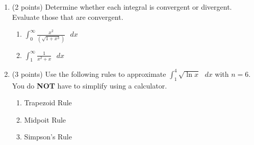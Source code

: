 \documentclass[paper=a4, fontsize=11pt]{scrartcl} %
\numberwithin{equation}{section} %
\numberwithin{figure}{section} %
\numberwithin{table}{section} %
\begin{document}
\begin{enumerate}
\vspace{1.5in}

\item (2 points) Determine whether each integral is convergent or divergent.  Evaluate those that are convergent.
\begin{enumerate}
\item \begin{large}$\int_0^\infty \frac{x^2}{(\sqrt{1+x^3})} \text { } dx$\end{large}
\vspace{1.5in}
\item \begin{large}$\int_1^\infty \frac{1}{x^2+x}\text { } dx$\end{large}
\end{enumerate}

\newpage

\item (3 points) Use the following rules to approximate $\int_1^4 \sqrt{\ln x} \text{ } dx$ with $n=6$.  You do \textbf{NOT} have to simplify using a calculator.\\
\begin{enumerate}
\item Trapezoid Rule
\vspace{2.5in}
\item Midpoit Rule
\vspace{2.5in}
\item Simpson's Rule
\end{enumerate}

\end{enumerate}

\end{document}

